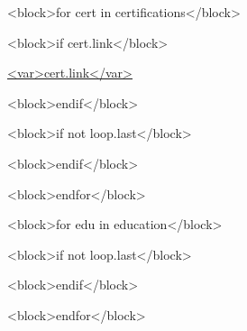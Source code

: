 \documentclass[10pt,a4paper,ragged2e,withhyper]{altacv}
\begin{document}
\begin{paracol}{2}

  <block>for cert in certifications</block>


  <block>if cert.link</block>

    \href{<var>cert.link</var>}{<var>cert.link</var>}

  <block>endif</block>
  
  <block>if not loop.last</block>

  \divider

  <block>endif</block>

  <block>endfor</block>

  \medskip


  <block>for edu in education</block>


  <block>if not loop.last</block>

  \divider

  <block>endif</block>

  <block>endfor</block>

\end{paracol}
\end{document}
